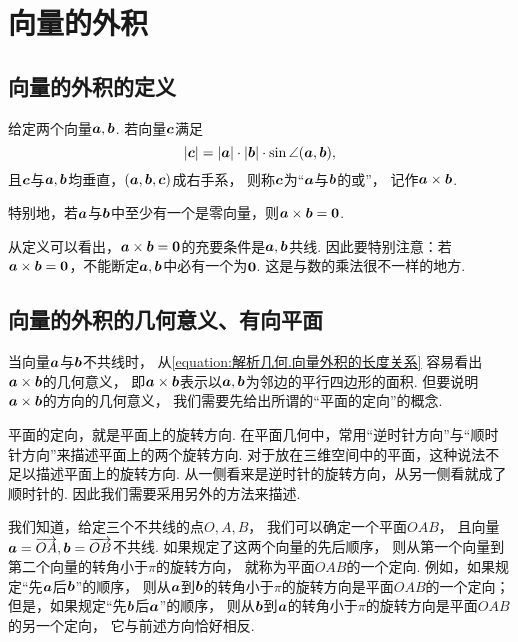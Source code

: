 \section{向量的外积}
\subsection{向量的外积的定义}
\begin{definition}
给定两个向量\(\boldsymbol{a},\boldsymbol{b}\).
若向量\(\boldsymbol{c}\)满足
\begin{equation}\label{equation:解析几何.向量外积的长度关系}
	\abs{\boldsymbol{c}}
	= \abs{\boldsymbol{a}} \cdot \abs{\boldsymbol{b}} \cdot \sin\angle(\boldsymbol{a},\boldsymbol{b}),
\end{equation}
且\(\boldsymbol{c}\)与\(\boldsymbol{a},\boldsymbol{b}\)均垂直，\((\boldsymbol{a},\boldsymbol{b},\boldsymbol{c})\)成右手系，
则称\(\boldsymbol{c}\)为“\(\boldsymbol{a}\)与\(\boldsymbol{b}\)的或”，
记作\(\boldsymbol{a}\times\boldsymbol{b}\).

特别地，若\(\boldsymbol{a}\)与\(\boldsymbol{b}\)中至少有一个是零向量，则\(\boldsymbol{a}\times\boldsymbol{b}=\boldsymbol{0}\).
\end{definition}

从定义可以看出，\(\boldsymbol{a}\times\boldsymbol{b}=\boldsymbol{0}\)的充要条件是\(\boldsymbol{a},\boldsymbol{b}\)共线.
因此要特别注意：若\(\boldsymbol{a}\times\boldsymbol{b}=\boldsymbol{0}\)，不能断定\(\boldsymbol{a},\boldsymbol{b}\)中必有一个为\(\boldsymbol{0}\).
这是与数的乘法很不一样的地方.

\subsection{向量的外积的几何意义、有向平面}
当向量\(\boldsymbol{a}\)与\(\boldsymbol{b}\)不共线时，
从\cref{equation:解析几何.向量外积的长度关系} 容易看出\(\boldsymbol{a}\times\boldsymbol{b}\)的几何意义，
即\(\boldsymbol{a}\times\boldsymbol{b}\)表示以\(\boldsymbol{a},\boldsymbol{b}\)为邻边的平行四边形的面积.
但要说明\(\boldsymbol{a}\times\boldsymbol{b}\)的方向的几何意义，
我们需要先给出所谓的“平面的定向”的概念.

平面的定向，就是平面上的旋转方向.
在平面几何中，常用“逆时针方向”与“顺时针方向”来描述平面上的两个旋转方向.
对于放在三维空间中的平面，这种说法不足以描述平面上的旋转方向.
从一侧看来是逆时针的旋转方向，从另一侧看就成了顺时针的.
因此我们需要采用另外的方法来描述.

我们知道，给定三个不共线的点\(O,A,B\)，
我们可以确定一个平面\(OAB\)，
且向量\(\boldsymbol{a}=\overrightarrow{OA},
\boldsymbol{b}=\overrightarrow{OB}\)不共线.
如果规定了这两个向量的先后顺序，
则从第一个向量到第二个向量的转角小于\(\pi\)的旋转方向，
就称为平面\(OAB\)的一个定向.
例如，如果规定“先\(\boldsymbol{a}\)后\(\boldsymbol{b}\)”的顺序，
则从\(\boldsymbol{a}\)到\(\boldsymbol{b}\)的转角小于\(\pi\)的旋转方向是平面\(OAB\)的一个定向；
但是，如果规定“先\(\boldsymbol{b}\)后\(\boldsymbol{a}\)”的顺序，
则从\(\boldsymbol{b}\)到\(\boldsymbol{a}\)的转角小于\(\pi\)的旋转方向是平面\(OAB\)的另一个定向，
它与前述方向恰好相反.

